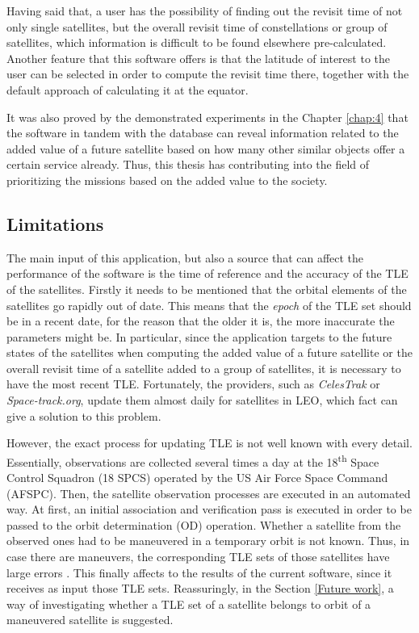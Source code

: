 Having said that, a user has the possibility of finding out the revisit time of not only single satellites, but the overall revisit time of constellations or group of satellites, which information is difficult to be found elsewhere pre-calculated. Another feature that this software offers is that the latitude of interest to the user can be selected in order to compute the revisit time there, together with the default approach of calculating it at the equator.

It was also proved by the demonstrated experiments in the Chapter \ref{chap:4} that the software in tandem with the database can reveal information related to the added value of a future satellite based on how many other similar objects offer a certain service already. Thus, this thesis has contributing into the field of prioritizing the missions based on the added value to the society.



\bigskip
\subsection{Limitations} %
\bigskip

The main input of this application, but also a source that can affect the performance of the software is the time of reference and the accuracy of the TLE of the satellites. Firstly it needs to be mentioned that the orbital elements of the satellites go rapidly out of date. This means that the \textit{epoch} of the TLE set should be in a recent date, for the reason that the older it is, the more inaccurate the parameters might be. In particular, since the application targets to the future states of the satellites when computing the added value of a future satellite or the overall revisit time of a satellite added to a group of satellites, it is necessary to have the most recent TLE. Fortunately, the providers, such as \textit{CelesTrak} or \textit{Space-track.org}, update them almost daily for satellites in LEO, which fact can give a solution to this problem.

However, the exact process for updating TLE is not well known with every detail. Essentially, observations are collected several times a day at the 18\textsuperscript{th} Space Control Squadron (18 SPCS) operated by the US Air Force Space Command (AFSPC).
Then, the satellite observation processes are executed in an automated way. At first, an initial association and verification pass is executed in order to be passed to the orbit determination (OD) operation. Whether a satellite from the observed ones had to be maneuvered in a temporary orbit is not known. Thus, in case there are maneuvers, the corresponding TLE sets of those satellites have large errors \cite{TLE_Vallado}. This finally affects to the results of the current software, since it receives as input those TLE sets. Reassuringly, in the Section \ref{Future work}, a way of investigating whether a TLE set of a satellite belongs to orbit of a maneuvered satellite is suggested. 

